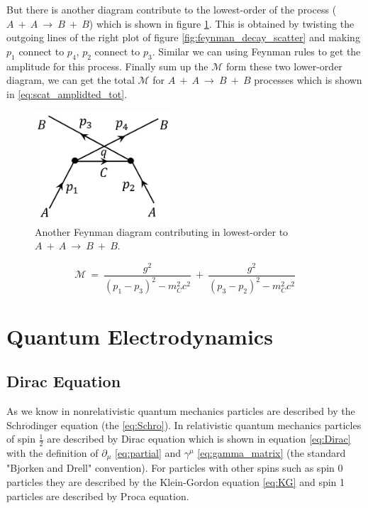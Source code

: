 But there is another diagram contribute to the lowest-order of the process ($A~+~A~\rightarrow~B~+~B$) which is shown in figure \ref{fig:feynman_scatter_2}. This is obtained by twisting the outgoing lines of the right plot of figure \ref{fig:feynman_decay_scatter} and making $p_{1}$ connect to $p_{4}$, $p_{2}$ connect to $p_{3}$. Similar we can using Feynman rules to get the amplitude for this process. Finally sum up the $\mathcal{M}$ form these two lower-order diagram, we can get the total $\mathcal{M}$ for $A~+~A~\rightarrow~B~+~B$ processes which is shown in \ref{eq:scat_amplidted_tot}.
\begin{figure}[h!]
 \begin{center}
\includegraphics[width=0.45\textwidth]{figures/theory/feynman_scatter_2.png}
\caption{Another Feynman diagram contributing in lowest-order to $A~+~A~\rightarrow~B~+~B$.}
  \label{fig:feynman_scatter_2}
 \end{center}
\end{figure}
\begin{equation}
\mathcal{M}~=~\frac{g^{2}}{(p_{1}-p_{3})^{2}-m_{C}^{2}c^{2}}~+~\frac{g^{2}}{(p_{3}-p_{2})^{2}-m_{C}^{2}c^{2}}
\label{eq:scat_amplidted_tot}
\end{equation}

\clearpage
\section{Quantum Electrodynamics}\label{subsec:QED}
\subsection{Dirac Equation}\label{subsec:Dirac}
As we know in nonrelativistic quantum mechanics particles are described by the Schr$\mathrm{\ddot{o}}$dinger equation (the \ref{eq:Schro}). In relativistic quantum mechanics  particles of spin $\frac{1}{2}$ are described by Dirac equation which is shown in equation \ref{eq:Dirac} with the definition of $\partial_{\mu}$ \ref{eq:partial} and $\gamma^{\mu}$ \ref{eq:gamma_matrix} (the standard "Bjorken and Drell" convention). For particles with other spins such as spin 0 particles they are described by the Klein-Gordon equation \ref{eq:KG} and spin 1 particles are described by Proca equation.


